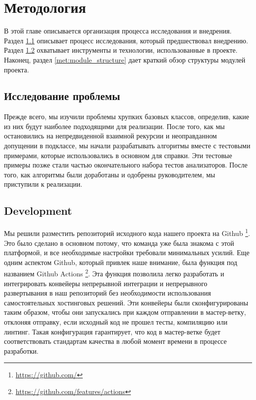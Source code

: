\chapter{Методология}
\label{chap:met}

В этой главе описывается организация процесса исследования и внедрения. Раздел \ref{met:research} описывает процесс исследования, который предшествовал внедрению. Раздел \ref{met:development} охватывает инструменты и технологии, использованные в проекте. Наконец, раздел \ref{met:module_structure} дает краткий обзор структуры модулей проекта. 

\section{Исследование проблемы}
\label{met:research}
Прежде всего, мы изучили проблемы хрупких базовых классов, определив, какие из них будут наиболее подходящими для реализации. После того, как мы остановились на непредвиденной взаимной рекурсии и неоправданном допущении в подклассе, мы начали разрабатывать алгоритмы вместе с тестовыми примерами, которые использовались в основном для справки. Эти тестовые примеры позже стали частью окончательного набора тестов анализаторов. После того, как алгоритмы были доработаны и одобрены руководителем, мы приступили к реализации.

\section{Development}
\label{met:development}
Мы решили разместить репозиторий исходного кода нашего проекта на Github \footnote{\url{https://github.com/}}. Это было сделано в основном потому, что команда уже была знакома с этой платформой, и все необходимые настройки требовали минимальных усилий. Еще одним аспектом Github, который привлек наше внимание, была функция под названием Github Actions \footnote{\url{https://github.com/features/actions}}. Эта функция позволила легко разработать и интегрировать конвейеры непрерывной интеграции \cite{ci} и непрерывного развертывания \cite{cd} в наш репозиторий без необходимости использования самостоятельных хостинговых решений. Эти конвейеры были сконфигурированы таким образом, чтобы они запускались при каждом отправлении в мастер-ветку, отклоняя отправку, если исходный код не прошел тесты, компиляцию или линтинг. Такая конфигурация гарантирует, что код в мастер-ветке будет соответствовать стандартам качества в любой момент времени в процессе разработки. 

